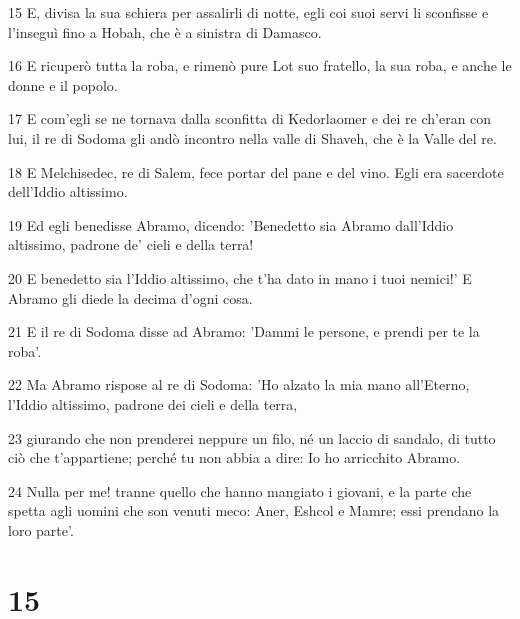 \par 15 E, divisa la sua schiera per assalirli di notte, egli coi suoi servi li sconfisse e l'inseguì fino a Hobah, che è a sinistra di Damasco.
\par 16 E ricuperò tutta la roba, e rimenò pure Lot suo fratello, la sua roba, e anche le donne e il popolo.
\par 17 E com'egli se ne tornava dalla sconfitta di Kedorlaomer e dei re ch'eran con lui, il re di Sodoma gli andò incontro nella valle di Shaveh, che è la Valle del re.
\par 18 E Melchisedec, re di Salem, fece portar del pane e del vino. Egli era sacerdote dell'Iddio altissimo.
\par 19 Ed egli benedisse Abramo, dicendo: 'Benedetto sia Abramo dall'Iddio altissimo, padrone de' cieli e della terra!
\par 20 E benedetto sia l'Iddio altissimo, che t'ha dato in mano i tuoi nemici!' E Abramo gli diede la decima d'ogni cosa.
\par 21 E il re di Sodoma disse ad Abramo: 'Dammi le persone, e prendi per te la roba'.
\par 22 Ma Abramo rispose al re di Sodoma: 'Ho alzato la mia mano all'Eterno, l'Iddio altissimo, padrone dei cieli e della terra,
\par 23 giurando che non prenderei neppure un filo, né un laccio di sandalo, di tutto ciò che t'appartiene; perché tu non abbia a dire: Io ho arricchito Abramo.
\par 24 Nulla per me! tranne quello che hanno mangiato i giovani, e la parte che spetta agli uomini che son venuti meco: Aner, Eshcol e Mamre; essi prendano la loro parte'.

\chapter{15}

